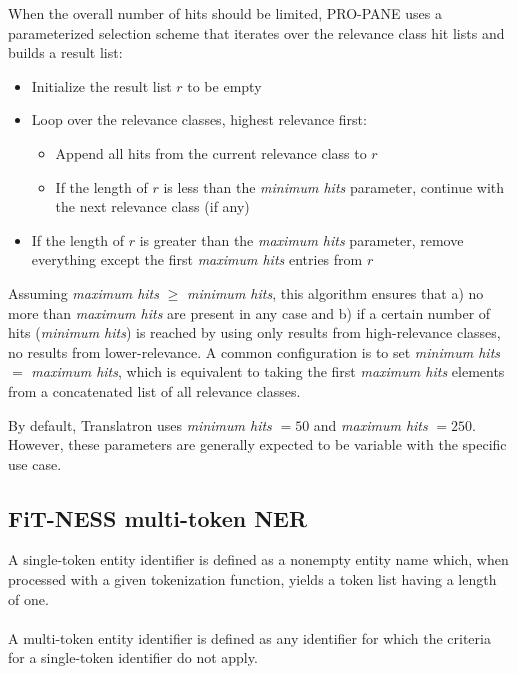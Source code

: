 \documentclass[a4paper, 12pt, twoside, reqn]{report}
\numberwithin{figure}{chapter}
\newtheorem[L]{boxedDefinition}{Definition}
\newtheorem[L]{boxedExample}{Example}
\begin{document}
When the overall number of hits should be limited, PRO-PANE uses a parameterized selection scheme that iterates over the relevance class hit lists and builds a result list:
\begin{itemize}
 \item Initialize the result list $r$ to be empty
 \item Loop over the relevance classes, highest relevance first:
 \begin{itemize}
  \item Append all hits from the current relevance class to $r$
  \item If the length of $r$ is less than the \textit{minimum hits} parameter, continue with the next relevance class (if any)
 \end{itemize}
 \item If the length of $r$ is greater than the \textit{maximum hits} parameter, remove everything except the first \textit{maximum hits} entries from $r$
\end{itemize}

Assuming \textit{maximum hits} $\geq$ \textit{minimum hits}, this algorithm ensures that a) no more than \textit{maximum hits} are present in any case and b) if a certain number of hits (\textit{minimum hits}) is reached by using only results from high-relevance classes, no results from lower-relevance. A common configuration is to set \textit{minimum hits} $=$ \textit{maximum hits}, which is equivalent to taking the first \textit{maximum hits} elements from a concatenated list of all relevance classes.

By default, Translatron uses \textit{minimum hits} $ = 50$ and \textit{maximum hits} $ = 250$. However, these parameters are generally expected to be variable with the specific use case.


\subsection{FiT-NESS multi-token NER}\label{sec:fitness}

\begin{boxedDefinition}\label{def:singlemultitokenentity}
A single-token entity identifier is defined as a nonempty entity name which, when processed with a given tokenization function, yields a token list having a length of one.\\\\
A multi-token entity identifier is defined as any identifier for which the criteria for a single-token identifier do not apply.
\end{boxedDefinition}
\end{document}
